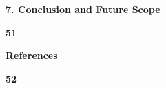 \documentclass[12pt, English]{article}
\newcommand\tab[1][1cm]{\hspace*{#1}}
\begin{document}
\begin{titlepage}


\noindent 
{\begin{large}
\textbf{\tab 7. Conclusion and Future Scope}
\end{large}
}
\hfill 
{
\begin{large}
\textbf{51}
\end{large}
}

\noindent 
{\begin{large}
\textbf{\tab\tab  References}
\end{large}
}
\hfill 
{
\begin{large}
\textbf{52}
\end{large}
}
\end{titlepage}


\newpage
\end{document}
